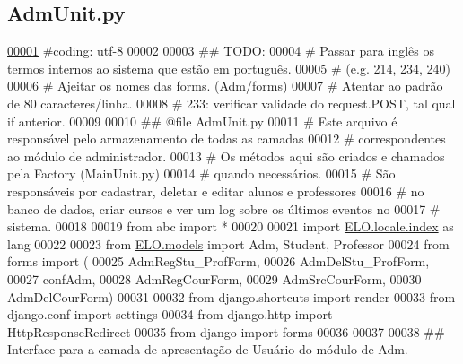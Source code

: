\hypertarget{AdmUnit_8py_source}{}\subsection{Adm\+Unit.\+py}
\label{AdmUnit_8py_source}

\begin{DoxyCode}
\hypertarget{AdmUnit_8py_source_l00001}{}\hyperlink{namespaceAdm_1_1AdmUnit}{00001} \textcolor{comment}{#coding: utf-8}
00002 
00003 \textcolor{comment}{## TODO:}
00004 \textcolor{comment}{#   Passar para inglês os termos internos ao sistema que estão em português. }
00005 \textcolor{comment}{#       (e.g. 214, 234, 240)}
00006 \textcolor{comment}{#   Ajeitar os nomes das forms. (Adm/forms)}
00007 \textcolor{comment}{#   Atentar ao padrão de 80 caracteres/linha.}
00008 \textcolor{comment}{#   233: verificar validade do request.POST, tal qual if anterior.}
00009 
00010 \textcolor{comment}{## @file AdmUnit.py}
00011 \textcolor{comment}{#   Este arquivo é responsável pelo armazenamento de todas as camadas }
00012 \textcolor{comment}{#   correspondentes ao módulo de administrador. }
00013 \textcolor{comment}{#   Os métodos aqui são criados e chamados pela Factory (MainUnit.py)}
00014 \textcolor{comment}{#   quando necessários. }
00015 \textcolor{comment}{#   São responsáveis por cadastrar, deletar e editar alunos e professores }
00016 \textcolor{comment}{#   no banco de dados, criar cursos e ver um log sobre os últimos eventos no}
00017 \textcolor{comment}{#   sistema.}
00018 
00019 \textcolor{keyword}{from} abc \textcolor{keyword}{import} *
00020 
00021 \textcolor{keyword}{import} \hyperlink{namespaceELO_1_1locale_1_1index}{ELO.locale.index} \textcolor{keyword}{as} lang
00022 
00023 \textcolor{keyword}{from} \hyperlink{namespaceELO_1_1models}{ELO.models} \textcolor{keyword}{import} Adm, Student, Professor
00024 \textcolor{keyword}{from} forms \textcolor{keyword}{import} (
00025     AdmRegStu\_ProfForm,
00026     AdmDelStu\_ProfForm,
00027     confAdm,
00028     AdmRegCourForm,
00029     AdmSrcCourForm,
00030     AdmDelCourForm)
00031 
00032 \textcolor{keyword}{from} django.shortcuts \textcolor{keyword}{import} render
00033 \textcolor{keyword}{from} django.conf \textcolor{keyword}{import} settings
00034 \textcolor{keyword}{from} django.http \textcolor{keyword}{import} HttpResponseRedirect
00035 \textcolor{keyword}{from} django \textcolor{keyword}{import} forms
00036 
00037 
00038 \textcolor{comment}{## Interface para a camada de apresentação de Usuário do módulo de Adm.}

\end{DoxyCode}
